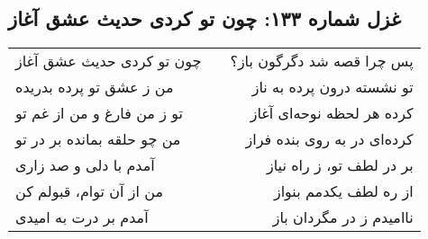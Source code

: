 \begin{center}
\section*{غزل شماره ۱۳۳: چون تو کردی حدیث عشق آغاز}
\label{sec:133}
\begin{longtable}{l p{0.5cm} r}
چون تو کردی حدیث عشق آغاز
&&
پس چرا قصه شد دگرگون باز؟
\\
من ز عشق تو پرده بدریده
&&
تو نشسته درون پرده به ناز
\\
تو ز من فارغ و من از غم تو
&&
کرده هر لحظه نوحه‌ای آغاز
\\
من چو حلقه بمانده بر در تو
&&
کرده‌ای در به روی بنده فراز
\\
آمدم با دلی و صد زاری
&&
بر در لطف تو، ز راه نیاز
\\
من از آن توام، قبولم کن
&&
از ره لطف یکدمم بنواز
\\
آمدم بر درت به امیدی
&&
ناامیدم ز در مگردان باز
\\
\end{longtable}
\end{center}
